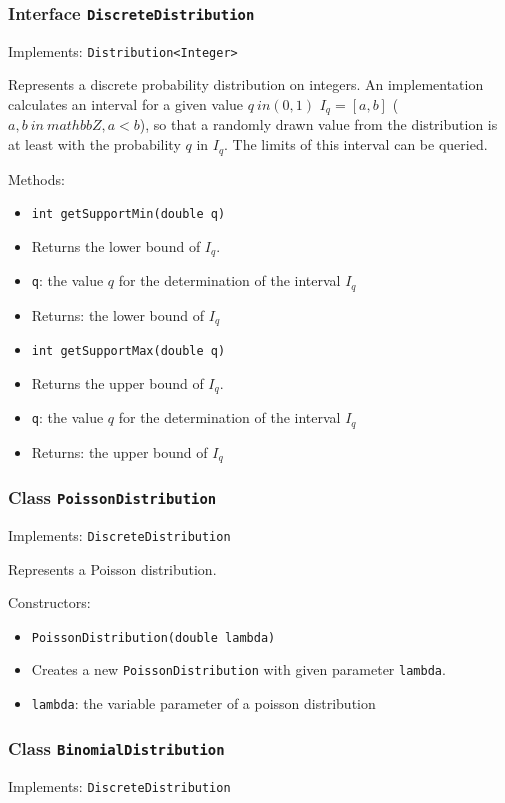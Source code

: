 \documentclass[parskip=full,11pt]{scrartcl}
\begin{document}
\subsubsection{Interface \texttt{DiscreteDistribution}}
Implements: \texttt{Distribution<Integer>}

Represents a discrete probability distribution on integers. An implementation calculates an interval for a given value \(q \ in (0,1) \) \(I_q = [a, b] \) (\(a, b \ in \ mathbb {Z}, a < b \)), so that a randomly drawn value from the distribution is at least with the probability \(q \) in \(I_q \). The limits of this interval can be queried.

Methods:
\begin{itemize}\itemsep -10pt
\item \texttt{int getSupportMin(double q)}
\item[] Returns the lower bound of \(I_q\).
\item[] \texttt{q}: the value \(q\) for the determination of the interval \(I_q\)
\item[] Returns: the lower bound of \(I_q\)

\item \texttt{int getSupportMax(double q)}
\item[] Returns the upper bound of \(I_q\).
\item[] \texttt{q}: the value \(q\) for the determination of the interval \(I_q\)
\item[] Returns: the upper bound of \(I_q\)
\end{itemize}

\subsubsection{Class \texttt{PoissonDistribution}}
Implements: \texttt{DiscreteDistribution}

Represents a Poisson distribution.

Constructors:
\begin{itemize}\itemsep -10pt
\item \texttt{PoissonDistribution(double lambda)}
\item[] Creates a new \texttt{PoissonDistribution} with given parameter \texttt{lambda}.
\item[] \texttt{lambda}: the variable parameter of a poisson distribution
\end{itemize}

\subsubsection{Class \texttt{BinomialDistribution}}
Implements: \texttt{DiscreteDistribution}
\end{document}
